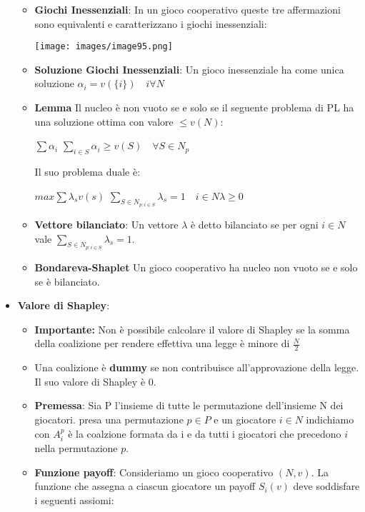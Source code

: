 \documentclass{article}
\theoremstyle{definition}
\theoremstyle{remark}
\begin{document}
\begin{itemize}
\begin{itemize}
        \item\textbf{Giochi Inessenziali}: In un gioco cooperativo queste tre affermazioni sono equivalenti e caratterizzano i giochi inessenziali:\begin{center}
            \texttt{[image: images/image95.png]}
        \end{center}
        \item\textbf{Soluzione Giochi Inessenziali}: Un gioco inessenziale ha come unica soluzione $\alpha_i=v(\{i\})\quad i\forall N$
        \item \textbf{Lemma} Il nucleo è non vuoto se e solo se il seguente problema di PL ha una soluzione ottima con valore $\leq v(N)$: \begin{center}
            $\sum \alpha_i$\newline
            $\sum_{i\in S}\alpha_i\geq v(S)\quad \forall S \in N_p$
        \end{center}
        Il suo problema duale è:\begin{center}
            $max \sum\lambda_sv(s)$\newline
            $\sum_{S\in N_{p:i\in S}}\lambda_s=1\quad i \in N$\newline $\lambda\geq0$
        \end{center}
        \item \textbf{Vettore bilanciato}: Un vettore $\lambda$ è detto bilanciato se per ogni $i\in N$ vale $\sum_{S\in N_{p:i\in S}}\lambda_s=1$.
        \item\textbf{Bondareva-Shaplet} Un gioco cooperativo ha nucleo non vuoto se e solo se è bilanciato.
    \end{itemize} 
    \item \textbf{Valore di Shapley}:\begin{itemize}
    \item \textbf{Importante:} Non è possibile calcolare il valore di Shapley se la somma della coalizione per rendere effettiva una legge è minore di \(\frac{N}{2}\)\newline
    \item Una coalizione è \textbf{dummy} se non contribuisce all'approvazione della legge. Il suo valore di Shapley è 0.
        \item \textbf{Premessa}: Sia P l'insieme di tutte le permutazione dell'insieme N dei giocatori. presa una permutazione $p\in P$ e un giocatore $i\in N$ indichiamo con $A_i^p$ è la coalzione formata da i e da tutti i giocatori che precedono $i$ nella permutazione $p$.
        \item\textbf{Funzione payoff}: Consideriamo un gioco cooperativo $(N,v)$. La funzione che assegna a ciascun giocatore un payoff $S_i(v)$ deve soddisfare i seguenti assiomi:\begin{itemize}

\end{itemize}
\end{itemize}
\end{itemize}
\end{document}
